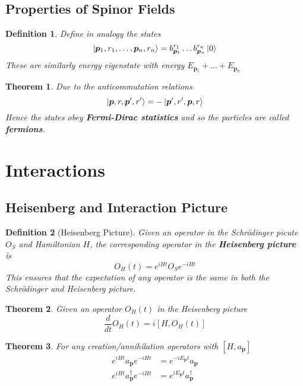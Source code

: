 \documentclass{article}
\newtheorem{theorem}{Theorem}[subsection]
\newtheorem{definition}{Definition}[subsection]
\newcommand{\bam}[1]{\textbf{#1}}
\newcommand{\comm}[2][]{\left[ #1, #2 \right]} %
\begin{document}
\subsection{Properties of Spinor Fields}

\begin{definition}
Define in analogy the states 
\[
\ket{\bm{p}_1,r_1,\dots,\bm{p}_n,r_n} = b_{\bm{p}_1}^{r_1} \dots b_{\bm{p}_n}^{r_n} \ket{0}
\]
These are similarly energy eigenstate with energy $E_{\bm{p}_1}+\dots+E_{\bm{p}_n}$
\end{definition}

\begin{theorem}
Due to the anticommutation relations 
\[
\ket{\bm{p},r,\bm{p}^\prime,r^\prime}=-\ket{\bm{p}^\prime,r^\prime,\bm{p},r}
\]
Hence the states obey \bam{Fermi-Dirac statistics} and so the particles are called \bam{fermions}.  
\end{theorem}
\section{Interactions}

\subsection{Heisenberg and Interaction Picture}

\begin{definition}[Heisenberg Picture]
Given an operator in the Schr\"odinger picute $O_S$ and Hamiltonian $H$, the corresponding operator in the \bam{Heisenberg picture} is 
\[
O_H (t) = e^{iHt} O_S e^{-iHt}
\]
This ensures that the expectation of any operator is the same in both the Schr\"odinger and Heisenberg picture. 
\end{definition}

\begin{theorem}
Given an operator $O_H(t)$ in the Heisenberg picture 
\[
\frac{d}{dt} O_H(t) = i \comm[H]{O_H(t)}
\]
\end{theorem}

\begin{theorem}
For any creation/annihilation operators with $\comm[H]{a_{\bm{p}}}$
\begin{align*}
e^{iHt} a_{\bm{p}}  e^{-iHt} &= e^{-iE_{\bm{p}}t} a_{\bm{p}} \\
e^{iHt} a_{\bm{p}}^\dagger  e^{-iHt} &= e^{iE_{\bm{p}}t} a_{\bm{p}}^\dagger
\end{align*}
\end{theorem}
\end{document}
